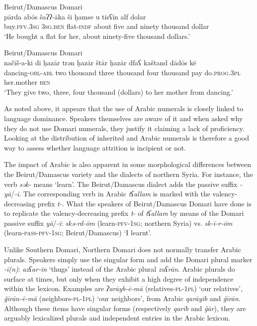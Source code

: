 \documentclass[output=paper]{langsci/langscibook}
\begin{document}
\ea
{Beirut/Damascus Domari}\\ \label{parda}
\gll pārda abōs šaʔʔ-āka ši ḫamse u tisʕīn alf dolar\\
     buy.\textsc{pfv.3sg} \textsc{3sg.ben} flat\textsc{{}-indf} about five and ninety thousand dollar\\
\glt ‘He bought a flat for her, about ninety-five thousand dollars.’
\z

\ea\label{ex:key:} \label{nacis}
{Beirut/Damascus Domari}\\
\gll načīš-a-ki dī ḥazār trən ḥazār štār ḥazār dfaʕ kaštand dādōs kē\\
     dancing-\textsc{obl-abl} two thousand three thousand four thousand pay do.\textsc{prog.3pl} her.mother \textsc{ben}\\
\glt ‘They give two, three, four thousand (dollars) to her mother from dancing.’
\z

As noted above, it appears that the use of Arabic numerals is closely linked to language dominance. Speakers themselves are aware of it and when asked why they do not use Domari numerals, they justify it claiming a lack of proficiency. Looking at the distribution of inherited and Arabic numerals is therefore a good way to assess whether language attrition is incipient or not.

The impact of Arabic is also apparent in some morphological differences between the Beirut/Damascus variety and the dialects of northern Syria. For instance, the verb \textit{sək-} means ‘learn’. The Beirut/Damascus dialect adds the passive suffix \textit{-yā}/\textit{-ī}. The corresponding verb in Arabic \textit{tʕallam} is marked with the valency-decreasing prefix \textit{t-}. What the speakers of Beirut/Damascus Domari have done is to replicate the valency-decreasing prefix \textit{t-} of \textit{tʕallam} by means of the Domari passive suffix  \textit{yā}/\textit{{}-ī}: \textit{skə-rd-ōm} (learn-\textsc{pfv-1sg}; northern Syria) vs. \textit{sk-ī-r-ōm} (learn-\textsc{pass-pfv-1sg}; Beirut/Damascus) ‘I learnt’.

Unlike Southern Domari, Northern Domari does not normally transfer Arabic plurals. Speakers simply use the singular form and add the Domari plural marker \textit{-ī(n)}:  \textit{azʕar-īn} ‘thugs’ instead of the Arabic plural \textit{zuʕrān}. Arabic plurals do surface at times, but only when they exhibit a high degree of independence within the lexicon. Examples are \textit{ʔarāyb-ē-mā} (relatives-\textsc{pl-1pl}) ‘our relatives’, \textit{\v{g}īrān-ē-mā} (neighbors-\textsc{pl-1pl}) ‘our neighbors’, from Arabic \textit{qarāyib} and \textit{\v{g}īrān}. Although these items have singular forms (respectively \textit{qarīb} and \textit{\v{g}ār}), they are arguably lexicalized plurals and independent entries in the Arabic lexicon.
\end{document}
